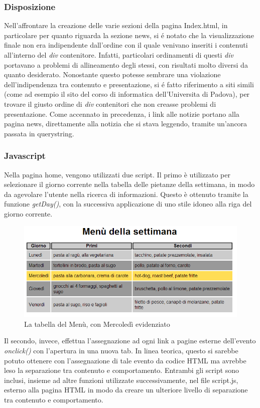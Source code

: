 \documentclass[10pt,a4paper,onecolumn]{article}
\begin{document}
\subsubsection{Disposizione}

Nell'affrontare la creazione delle varie sezioni della pagina Index.html, in particolare per quanto riguarda la sezione news, si é notato che la visualizzazione finale non era indipendente dall'ordine con il quale venivano inseriti i contenuti all'interno del \textit{div} contenitore. 
Infatti, particolari ordinamenti di questi \textit{div} portavano a problemi di allineamento degli stessi, con risultati molto diversi da quanto desiderato. Nonostante questo potesse sembrare una violazione dell'indipendenza tra contenuto e presentazione, si é fatto riferimento a siti simili (come ad esempio il sito del corso di informatica dell'Universita di Padova), per trovare il giusto ordine di \textit{div} contenitori che non creasse problemi di presentazione.
Come accennato in precedenza, i link alle notizie portano alla pagina news, direttamente alla notizia che si stava leggendo, tramite un'ancora passata in querystring.

\subsubsection{Javascript}

Nella pagina home, vengono utilizzati due script. Il primo è utilizzato per selezionare il giorno corrente nella tabella delle pietanze della settimana, in modo da agevolare l'utente nella ricerca di informazioni. Questo è ottenuto tramite la funzione \textit{getDay()}, con la successiva applicazione di uno stile idoneo alla riga del giorno corrente.
\begin{figure}[h]
\centering
\includegraphics[scale=0.45]{tabellaMenu}
\caption{La tabella del Menù, con Mercoledì evidenziato}
\label{tabellaMenu}
\end{figure}
Il secondo, invece, effettua l'assegnazione ad ogni link a pagine esterne dell'evento \textit{onclick()} con l'apertura in una nuova tab. In linea teorica, questo si sarebbe potuto ottenere con l'assegnazione di tale evento da codice HTML ma avrebbe leso la separazione tra contenuto e comportamento. 
Entrambi gli script sono inclusi, insieme ad altre funzioni utilizzate successivamente, nel file script.js, esterno alla pagina HTML in modo da creare un ulteriore livello di separazione tra contenuto e comportamento.
\end{document}
